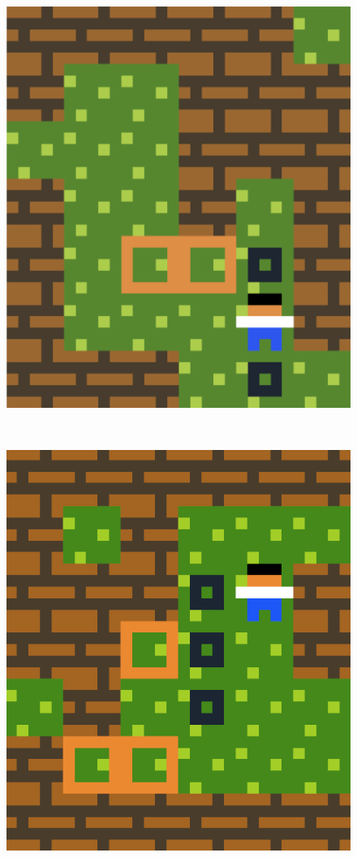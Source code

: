 \begin{figure}[!htbp]
\begin{minipage}[t]{0.2\textwidth}
\end{minipage}
$\:$
\begin{minipage}[t]{0.2\textwidth}
\includegraphics[width=\textwidth]{figures/finaldesign2_1.png} \hfill \\
\end{minipage}
$\:$
\begin{minipage}[t]{0.2\textwidth}
\includegraphics[width=\textwidth]{figures/finaldesign2_2.png} \hfill \\

\end{minipage}
\end{figure}
